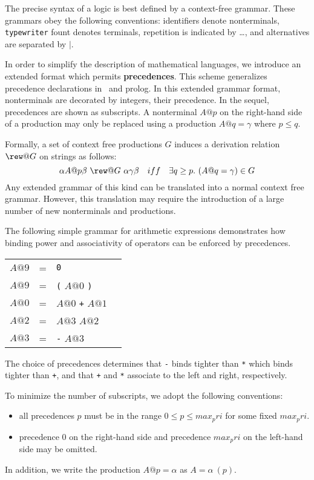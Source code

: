 The precise syntax of a logic is best defined by a context-free grammar.
These grammars obey the following conventions: identifiers denote
nonterminals, {\tt typewriter} fount denotes terminals, repetition is
indicated by \dots, and alternatives are separated by $|$.

In order to simplify the description of mathematical languages, we introduce
an extended format which permits {\bf precedences}.  This
scheme generalizes precedence declarations in \ML\ and {\sc prolog}.  In this
extended grammar format, nonterminals are decorated by integers, their
precedence.  In the sequel, precedences are shown as subscripts.  A nonterminal
$A@p$ on the right-hand side of a production may only be replaced using a
production $A@q = \gamma$ where $p \le q$.

Formally, a set of context free productions $G$ induces a derivation
relation $\rew@G$ on strings as follows:
\[ \alpha A@p \beta ~\rew@G~ \alpha\gamma\beta ~~~iff~~~
   \exists q \ge p.~(A@q=\gamma) \in G
\]
Any extended grammar of this kind can be translated into a normal context
free grammar.  However, this translation may require the introduction of a
large number of new nonterminals and productions.

\begin{example}
\label{PrecedenceEx}
The following simple grammar for arithmetic expressions demonstrates how
binding power and associativity of operators can be enforced by precedences.
\begin{center}
\begin{tabular}{rclr}
$A@9$ & = & {\tt0} \\
$A@9$ & = & {\tt(} $A@0$ {\tt)} \\
$A@0$ & = & $A@0$ {\tt+} $A@1$ \\
$A@2$ & = & $A@3$ {\tt*} $A@2$ \\
$A@3$ & = & {\tt-} $A@3$
\end{tabular}
\end{center}
The choice of precedences determines that \verb$-$ binds tighter than
\verb$*$ which binds tighter than \verb$+$, and that \verb$+$ and \verb$*$
associate to the left and right, respectively.
\end{example}

To minimize the number of subscripts, we adopt the following conventions:
\begin{itemize}
\item all precedences $p$ must be in the range $0 \leq p \leq max_pri$ for
  some fixed $max_pri$.
\item precedence $0$ on the right-hand side and precedence $max_pri$ on the
  left-hand side may be omitted.
\end{itemize}
In addition, we write the production $A@p = \alpha$ as $A = \alpha~(p)$.

